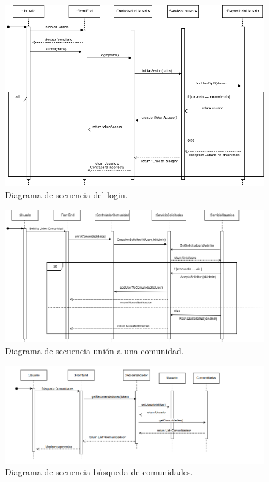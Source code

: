 \begin{figure}[H]
    \centering
    \includegraphics[width=\textwidth]{fotos/2-secuencia.png}
    \caption{Diagrama de secuencia del login.}
    \label{fig:diagrama_arquitectura}
\end{figure}
\begin{figure}[H]
    \centering
    \includegraphics[width=1\textwidth]{fotos/3-secuencia.png}
    \caption{Diagrama de secuencia unión a una comunidad.}
    \label{fig:diagrama_arquitectura}
\end{figure}

\begin{figure}[H]
    \centering
    \includegraphics[width=1\textwidth]{fotos/4-secuencia.png}
    \caption{Diagrama de secuencia búsqueda de comunidades.}
    \label{fig:diagrama_arquitectura_2}
\end{figure}


